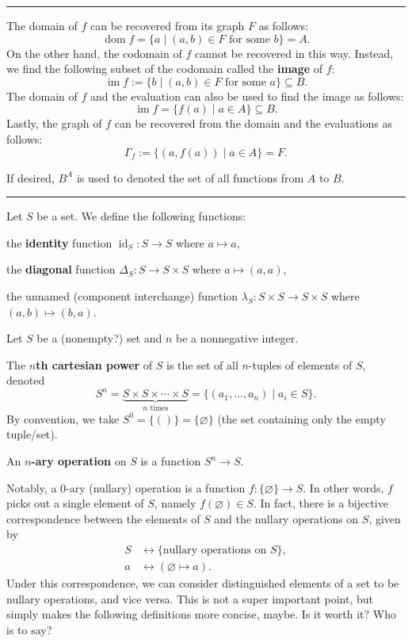 \documentclass[12pt]{article}
\newcommand{\keyword}[1]{\textbf{#1}}
\newcommand{\sepline}{\rule{\textwidth}{0.4pt}}
\theoremstyle{definition}
\renewcommand{\emptyset}{\varnothing}
\newcommand{\<}{\left\langle}
\renewcommand{\>}{\right\rangle}
\newcommand{\seq}{\subseteq}
\DeclareMathOperator{\dom}{dom}
\DeclareMathOperator{\id}{id}
\DeclareMathOperator{\im}{im}
\begin{document}
\sepline

The domain of $f$ can be recovered from its graph $F$ as follows:
\[
    \dom f = \{a \mid (a, b) \in F \text{ for some } b\} = A.
\]
On the other hand, the codomain of $f$ cannot be recovered in this way.
Instead, we find the following subset of the codomain called the \keyword{image} of $f$:
\[
    \im f := \{b \mid (a, b) \in F \text{ for some } a\} \seq B.
\]
The domain of $f$ and the evaluation can also be used to find the image as follows:
\[
    \im f = \{f(a) \mid a \in A\} \seq B.
\]
Lastly, the graph of $f$ can be recovered from the domain and the evaluations as follows:
\[
    \Gamma_f := \{(a, f(a)) \mid a \in A\} = F.
\]



If desired, $B^A$ is used to denoted the set of all functions from $A$ to $B$.


\sepline

Let $S$ be a set.
We define the following functions:

the \keyword{identity} function $\id_S : S \to S$ where $a \mapsto a$,

the \keyword{diagonal} function $\Delta_S : S \to S \times S$ where $a \mapsto (a, a)$,

the unnamed (component interchange) function $\lambda_S : S \times S \to S \times S$ where $(a, b) \mapsto (b, a)$.




\newpage

Let $S$ be a (nonempty?) set and $n$ be a nonnegative integer.

The \keyword{$n$th cartesian power} of $S$ is the set of all $n$-tuples of elements of $S$, denoted
\[
    S^n
        = \underbrace{S \times S \times \cdots \times S}_{n \text{ times}}
        = \{(a_1, \dots, a_n) \mid a_i \in S\}.
\]
By convention, we take $S^0 = \{()\} = \{\emptyset\}$ (the set containing only the empty tuple/set).

An \keyword{$n$-ary operation} on $S$ is a function $S^{n} \to S$.

Notably, a $0$-ary (nullary) operation is a function $f : \{\emptyset\} \to S$.
In other words, $f$ picks out a single element of $S$, namely $f(\emptyset) \in S$.
In fact, there is a bijective correspondence between the elements of $S$ and the nullary operations on $S$, given by
\begin{align*}
    S &\longleftrightarrow \{\text{nullary operations on } S\}, \\
    a &\longleftrightarrow (\emptyset \mapsto a).
\end{align*}
Under this correspondence, we can consider distinguished elements of a set to be nullary operations, and vice versa.
This is not a super important point, but simply makes the following definitions more concise, maybe.
Is it worth it? Who is to say?
\end{document}

